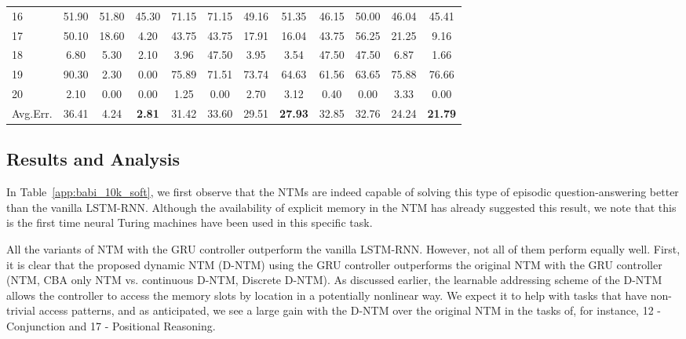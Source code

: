 \documentclass[12pt]{article}
\begin{document}
\begin{table*}[htbp]
\begin{tabular}{ | l || c | c | c || c |c |c|c|| c | c | c|c| }
16  &   51.90   &   51.80   &   45.30   &   71.15   &   71.15   &   49.16   &   51.35   &   46.15   &   50.00   &   46.04   &   45.41  \\
17  &   50.10   &   18.60   &   4.20    &   43.75   &   43.75   &   17.91   &   16.04   &   43.75   &   56.25   &   21.25   &   9.16   \\
18  &   6.80    &   5.30    &   2.10    &   3.96    &   47.50   &   3.95    &   3.54    &   47.50   &   47.50   &   6.87    &   1.66   \\
19  &   90.30   &   2.30    &   0.00    &   75.89   &   71.51   &   73.74   &   64.63   &   61.56   &   63.65   &   75.88   &   76.66  \\
20  &   2.10    &   0.00    &   0.00    &   1.25    &   0.00    &   2.70    &   3.12    &   0.40    &   0.00    &   3.33    &   0.00   \\\hline



Avg.Err. & 36.41 & 4.24 & \textbf{2.81} & 31.42 & 33.60 & 29.51 & \textbf{27.93} & 32.85 & 32.76 & 24.24 & \textbf{21.79} \\\hline
\end{tabular}
\caption{Test error rates (\%) on the 20 bAbI QA tasks for models using 10k training examples with the GRU and feedforward controller. FF stands for the experiments that are conducted with feedforward controller. Let us, note that LBA$^{\ast}$ refers to NTM that uses both LBA and CBA. In this table, we compare multi-step vs single-step addressing, original NTM with location based+content based addressing vs only content based addressing, and discrete vs continuous addressing on bAbI.}
\label{app:babi_10k_soft}
\end{table*}


\subsection{Results and Analysis}

In Table~\ref{app:babi_10k_soft}, we first observe that the NTMs are indeed capable of solving this type of episodic question-answering better than the vanilla LSTM-RNN. Although the availability of explicit memory in the NTM has already suggested this result, we note that this is the first time neural Turing machines have been used in this specific task.

All the variants of NTM with the GRU controller outperform the vanilla LSTM-RNN. However, not all of them perform equally well. First, it is clear that the proposed dynamic NTM (D-NTM) using the GRU controller outperforms the original NTM with the GRU controller (NTM, CBA only NTM vs. continuous D-NTM, Discrete D-NTM). As discussed earlier, the learnable addressing scheme of the D-NTM allows the controller to access the memory slots by location in a potentially nonlinear way. We expect it to help with tasks that have non-trivial access patterns, and as anticipated, we see a large gain with the D-NTM over the original NTM in the tasks of, for instance, 12 - Conjunction and 17 - Positional Reasoning. 
\end{document}
